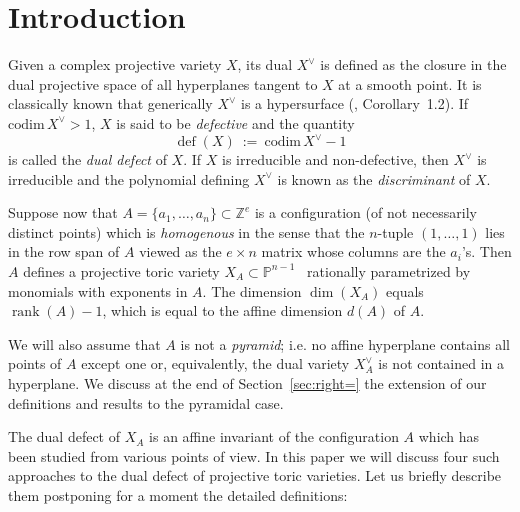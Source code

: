 \documentclass[11pt]{amsart}
\theoremstyle{plain}
\theoremstyle{definition}
\theoremstyle{remark}
\newcommand{\codim}{\textrm{codim}}
\newcommand{\rank}{\operatorname{rank}}
\newcommand{\defect}{{\operatorname {def}}}
\newcommand{\baseRing}[1]{\ensuremath{\mathbb{#1}}}
\newcommand{\Z}{\baseRing{Z}}
\newcommand{\CP}{\baseRing{P}}
\numberwithin{equation}{section}
\begin{document}
\section{Introduction}\label{sec:intro}

Given a complex projective variety $X$, its dual $X^\vee$ is defined as the closure in the dual 
projective space of all hyperplanes tangent to $X$ at a smooth point.  
It is classically known that generically $X^\vee$ is a hypersurface (\cite{GKZ}, Corollary~1.2).  
If $\codim\,X^\vee >1$,  $X$ is said to be {\em defective} and the quantity 
$$
\defect(X) \ :=\ \codim\,X^\vee -1
$$
is called the {\em dual defect} of $X$.  If $X$ is irreducible and non-defective, then $X^\vee$ is irreducible and the polynomial 
defining $X^\vee$ is known as the {\em discriminant} of $X$.

Suppose now that $A = \{a_1,\dots,a_n\} \subset \Z^e$ is a configuration (of not necessarily distinct points) which is 
{\em homogenous} in the sense that the $n$-tuple $(1,\dots,1)$ lies in 
the row span of $A$ viewed as the $e\times n$ matrix whose columns are the $a_i$'s.    Then $A$ defines a projective 
toric variety $X_A \subset \CP^{n-1}$~\cite{GKZ} rationally parametrized by monomials with exponents in $A$.
The dimension $\dim(X_A)$ equals $\rank(A)-1$, which is equal to the affine dimension $d(A)$ of $A$. 

We will also assume that $A$ 
is not a {\em pyramid}; i.e. no affine hyperplane contains all points of 
$A$ except one or, equivalently, the dual variety $X_A^\vee$ is not contained in a hyperplane. We discuss at the end of 
Section~\ref{sec:right=} the extension of our definitions and results to the pyramidal case.  


The dual defect of $X_A$ is an affine invariant of the configuration $A$ which has been studied from various points of view.  
In this paper we will discuss four such approaches to the  dual defect of projective toric varieties. 
Let us briefly describe them postponing for a moment the detailed definitions:
 
\end{document}
